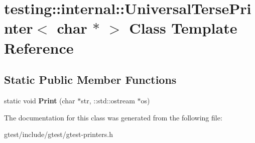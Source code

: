 \hypertarget{classtesting_1_1internal_1_1UniversalTersePrinter_3_01char_01_5_01_4}{}\section{testing\+:\+:internal\+:\+:Universal\+Terse\+Printer$<$ char $\ast$ $>$ Class Template Reference}
\label{classtesting_1_1internal_1_1UniversalTersePrinter_3_01char_01_5_01_4}
\subsection*{Static Public Member Functions}
\begin{DoxyCompactItemize}
\item 
\mbox{\label{classtesting_1_1internal_1_1UniversalTersePrinter_3_01char_01_5_01_4_aa9ef95587c1461fe33e254af52401a43}} 
static void {\bfseries Print} (char $\ast$str, \+::std\+::ostream $\ast$os)
\end{DoxyCompactItemize}


The documentation for this class was generated from the following file\+:\begin{DoxyCompactItemize}
\item 
gtest/include/gtest/gtest-\/printers.\+h\end{DoxyCompactItemize}

